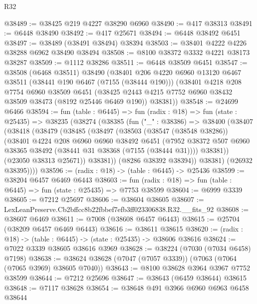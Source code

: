 \begin{lexlean}{R32}
\begin{coremodule}
@38489 := @38425 @219 @4227 @38290 @6960
@38490 := @417 @38313
@38491 := @6448 @38490
@38492 := @417 @25671
@38494 := @6448 @38492 @6451
@38497 := @38489 (@38491 @38494) @38394
@38503 := @38401 @4222 @4226 @38288 @6962 @38490 @38494
@38508 := @8100 @38372 @3332 @4221 @38173 @38287
@38509 := @1112 @38286
@38511 := @6448 @38509 @6451
@38547 := @38508
    (@6468 @38511)
    @38490
    (@38401
      @206
      @4220
      @6960
      @13120
      @6467
      @38511
      (@38441 @190 @6467 (@7155 (@38444 @190)))
      (@38401
        @4218
        @208
        @7754
        @6960
        @38509
        @6451
        (@38425 @2443 @4215 @7752 @6960 @38432 @38509 @38473 (@8192 @25446 @6469 @190))
        @38381))
@38548 := @24699 @6466
@38594 := fun (table : @6445) =>
  fun (radix : @18) =>
  fun (state : @25435) =>
  @38235
    (@38274
      (@38385
        (fun ("_" : @38386) =>
        @38400
          (@38407
            (@38418
              (@38479
                (@38485
                  (@38497
                    (@38503
                      (@38547 (@38548 @38286))
                      (@38401
                        @4224
                        @208
                        @6960
                        @6960
                        @38492
                        @6451
                        (@7952
                          @38372
                          @507
                          @6960
                          @38365
                          @38492
                          (@38441 @31 @38368 (@7155 (@38444 @31))))
                        @38381))
                    (@23050 @38313 @25671))
                  @38381))
              (@8286 @38392 @38394))
            @38381)
          (@26932 @38395))))
@38596 := (radix : @18) -> (table : @6445) -> @25436
@38599 := @38204 @6457 @6469 @6443
@38603 := fun (radix : @18) => fun (table : @6445) => fun (state : @25435) => @7753 @38599
@38604 := @6999 @3339
@38605 := @7212 @25697
@38606 := @38604 @38605
@38607 := LexLeanPreserve.Cb2bffcc8b22fbbef7efb3ff023306838.R32.__fits_92
@38608 := @38607 @6469
@38611 := @7008 (@38608 @6457 @6443)
@38615 := @25704 (@38209 @6457 @6469 @6443)
@38616 := @38611 @38615
@38620 := (radix : @18) -> (table : @6445) -> (state : @25435) -> @38606 @38616
@38624 := @7022 @3339 @38605 @38616 @3969
@38628 := @38224 (@7030 (@7034 @6458) @7198)
@38638 := @38624 @38628 (@7047 (@7057 @3339)) (@7063 (@7064 (@7065 @3969) @38605 @7040))
@38643 := @8100 @38628 @3964 @3967 @7752 @38599
@38644 := @7212 @25696
@38647 := @38643 (@6459 @38644) @38615
@38648 := @7117 @38628
@38654 := @38648 @491 @3966 @6960 @6963 @6458 @38644

\end{coremodule}
\end{lexlean}
